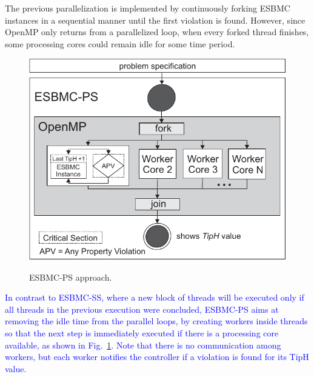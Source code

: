 \documentclass{doublecol-new}
\theoremstyle{TH}{
\newtheorem{lemma}{Lemma}
\newtheorem{theorem}[lemma]{Theorem}
\newtheorem{corrolary}[lemma]{Corrolary}
\newtheorem{conjecture}[lemma]{Conjecture}
\newtheorem{proposition}[lemma]{Proposition}
\newtheorem{claim}[lemma]{Claim}
\newtheorem{stheorem}[lemma]{Wrong Theorem}
\newtheorem{algorithm}{Algorithm}
}
\theoremstyle{THrm}{
\newtheorem{definition}{Definition}[section]
\newtheorem{question}{Question}[section]
\newtheorem{remark}{Remark}
\newtheorem{scheme}{Scheme}
}
\theoremstyle{THhit}{
\newtheorem{case}{Case}[section]
}
\begin{document}
The previous parallelization is implemented by continuously forking ESBMC instances in a sequential manner until the first violation is found. However, since OpenMP only returns from a parallelized loop, when every forked thread finishes, some processing cores could remain idle for some time period.

\begin{figure}[h]
	\caption{ESBMC-PS approach.}
	\centering
	\includegraphics[scale=0.77]{figures/esbmc-ps.pdf} 	
	\label{ESBMC-Multi-core-Optimized-Sequential-Approach}
\end{figure}

\textcolor{blue}{In contrast to ESBMC-SS, where a new block of threads will be executed only if all threads in the previous execution were concluded, ESBMC-PS aims at removing the idle time from the parallel loops, by creating workers inside threads so that the next step is immediately executed if there is a processing core available, as shown in Fig.~\ref{ESBMC-Multi-core-Optimized-Sequential-Approach}. Note that there is no communication among workers, but each worker notifies the controller if a violation is found for its TipH value}.

\end{document}
